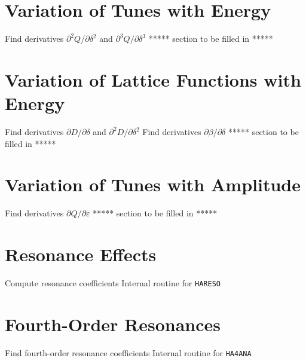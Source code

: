 \section{Variation of Tunes with Energy}
Find derivatives $\partial^2 Q / \partial\delta^2$ and
  $\partial^3 Q / \partial\delta^3$
***** section to be filled in *****

\section{Variation of Lattice Functions with Energy}
Find derivatives $\partial D / \partial\delta$ and
  $\partial^2 D / \partial\delta^2$
Find derivatives $\partial\beta / \partial\delta$
***** section to be filled in *****

\section{Variation of Tunes with Amplitude}
Find derivatives $\partial Q / \partial\varepsilon$
***** section to be filled in *****

\section{Resonance Effects}
Compute resonance coefficients
Internal routine for {\tt HARESO}

\section{Fourth-Order Resonances}
Find fourth-order resonance coefficients
Internal routine for {\tt HA4ANA}


